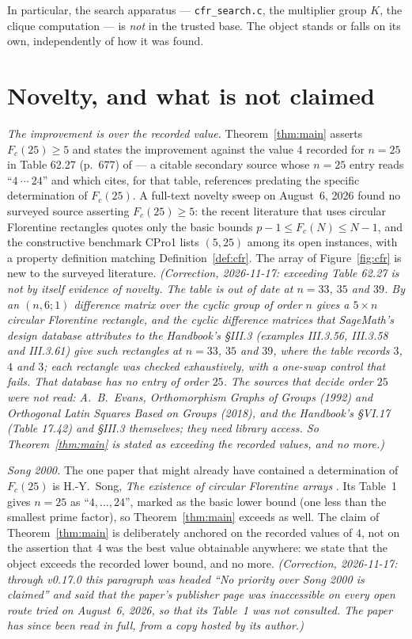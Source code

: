 \documentclass[11pt]{amsart}
\newcommand{\Fc}{F_{c}}
\theoremstyle{plain}
\theoremstyle{definition}
\theoremstyle{remark}
\begin{document}
In particular, the search apparatus --- \texttt{cfr\_search.c}, the multiplier
group $K$, the clique computation --- is \emph{not} in the trusted base. The
object stands or falls on its own, independently of how it was found.

\section{Novelty, and what is not claimed}\label{sec:novelty}

\emph{The improvement is over the recorded value.} Theorem~\ref{thm:main}
asserts $\Fc(25)\ge 5$ and states the improvement against the value $4$
recorded for $n=25$ in Table 62.27 (p.~677) of \cite{HCD} --- a citable
secondary source whose $n=25$ entry reads ``$4\ \cdots\ 24$'' and which cites,
for that table, references predating the specific determination of $\Fc(25)$.
A full-text novelty sweep on August~6, 2026 found no surveyed source asserting
$\Fc(25)\ge 5$: the recent literature that uses circular Florentine rectangles
quotes only the basic bounds $p-1\le\Fc(N)\le N-1$, and the constructive
benchmark CPro1 \cite{CPro1} lists $(5,25)$ among its open instances, with a
property definition matching Definition~\ref{def:cfr}. The array of
Figure~\ref{fig:cfr} is new to the surveyed literature. \emph{(Correction,
2026-11-17: exceeding Table 62.27 is not by itself evidence of novelty. The
table is out of date at $n=33$, $35$ and $39$. By \cite[Theorem
62.23(5)]{HCD} an $(n,6;1)$ difference matrix over the cyclic group of order
$n$ gives a $5\times n$ circular Florentine rectangle, and the cyclic
difference matrices that SageMath's design database attributes to the
Handbook's \S III.3 (examples III.3.56, III.3.58 and III.3.61) give such
rectangles at $n=33$, $35$ and $39$, where the table records $3$, $4$ and
$3$; each rectangle was checked exhaustively, with a one-swap control that
fails. That database has no entry of order $25$. The sources that decide
order $25$ were not read: A.~B.~Evans, \emph{Orthomorphism Graphs of Groups}
(1992) and \emph{Orthogonal Latin Squares Based on Groups} (2018), and the
Handbook's \S VI.17 (Table 17.42) and \S III.3 themselves; they need library
access. So Theorem~\ref{thm:main} is stated as exceeding the recorded
values, and no more.)}

\emph{Song 2000.} The one paper that might already have contained a
determination of $\Fc(25)$ is H.-Y.~Song, \emph{The existence of circular
Florentine arrays} \cite{Song00}. Its Table~1 gives $n=25$ as
``$4,\dots,24$'', marked as the basic lower bound (one less than the
smallest prime factor), so Theorem~\ref{thm:main} exceeds \cite{Song00} as
well. The claim of Theorem~\ref{thm:main} is deliberately anchored on the
recorded values of $4$, not on the assertion that $4$ was the best value
obtainable anywhere: we state that the object exceeds the recorded lower
bound, and no more. \emph{(Correction, 2026-11-17: through v0.17.0 this
paragraph was headed ``No priority over Song 2000 is claimed'' and said that
the paper's publisher page was inaccessible on every open route tried on
August~6, 2026, so that its Table~1 was not consulted. The paper has since
been read in full, from a copy hosted by its author.)}
\end{document}
